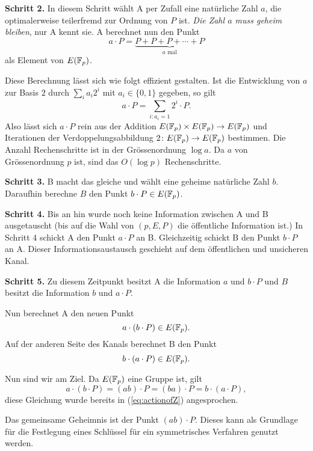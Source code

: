 \bigskip
\textbf{Schritt 2.} In diesem Schritt wählt A per Zufall eine
natürliche Zahl $a$, die optimalerweise teilerfremd zur Ordnung von
$P$ ist. \emph{Die Zahl $a$ muss geheim bleiben}, nur A kennt sie. A berechnet nun den Punkt
$$
a\cdot P = \underbrace{P+P+P+\cdots + P}_{\text{$a$ mal}}
$$
als Element von $E({\mathbb{F}}_p)$. 

Diese Berechnung lässt sich wie folgt effizient gestalten.
Ist die Entwicklung von $a$ zur Basis $2$ durch $\sum_{i} a_i 2^i$ mit
$a_{i}\in \{0,1\}$ gegeben, so gilt
$$
a\cdot P =\sum_{i : a_i=1} 2^i \cdot P.$$
Also lässt sich $a \cdot P$ rein aus der  Addition $E({\mathbb{F}}_p)\times
E({\mathbb{F}}_p)\rightarrow E({\mathbb{F}}_p)$  und Iterationen der
Verdoppelungsabbildung  $2\colon E({\mathbb{F}}_p)\rightarrow E({\mathbb{F}}_p)$
bestimmen. Die Anzahl Rechenschritte ist in der Grössenordnung $\log
a$. Da $a$ von Grössenordnung $p$ ist, sind das $O(\log p)$
Rechenschritte. 

\bigskip
\textbf{Schritt 3.} B macht das gleiche und wählt eine geheime natürliche Zahl
$b$. Daraufhin berechne $B$ den Punkt $b\cdot P \in E({\mathbb{F}}_p)$.

\bigskip
\textbf{Schritt 4.} Bis an hin wurde noch keine Information zwischen A
und B ausgetauscht (bis auf die Wahl von $(p,E,P)$ die öffentliche
Information ist.)
In Schritt 4 schickt A den Punkt $a\cdot P$ an B. Gleichzeitig schickt
B den Punkt
$b\cdot P$ an A. Dieser Informationsaustausch geschieht auf dem
öffentlichen und unsicheren Kanal. 


\bigskip
\textbf{Schritt 5.} Zu diesem Zeitpunkt besitzt A die Information $a$
und $b\cdot P$ und $B$ besitzt die Information $b$ und $a\cdot P$.

Nun berechnet A den neuen Punkt
\begin{equation*}
  a\cdot (b\cdot P) \in E({\mathbb{F}}_p).
\end{equation*}
Auf der anderen Seite des Kanals berechnet B den Punkt
\begin{equation*}
  b\cdot (a\cdot P) \in E({\mathbb{F}}_p).
\end{equation*}

Nun sind wir am Ziel. Da $E({\mathbb{F}}_p)$ eine Gruppe ist,
gilt
$$
a\cdot (b\cdot P) = (ab)\cdot P = (ba) \cdot P = b\cdot (a\cdot P),$$
diese Gleichung wurde bereits in (\ref{eq:actionofZ}) angesprochen.

Das gemeinsame Geheimnis ist der Punkt $(ab)\cdot P$. Dieses kann als
Grundlage für die Festlegung eines Schlüssel für ein symmetrisches
Verfahren genutzt werden.

\bigskip

